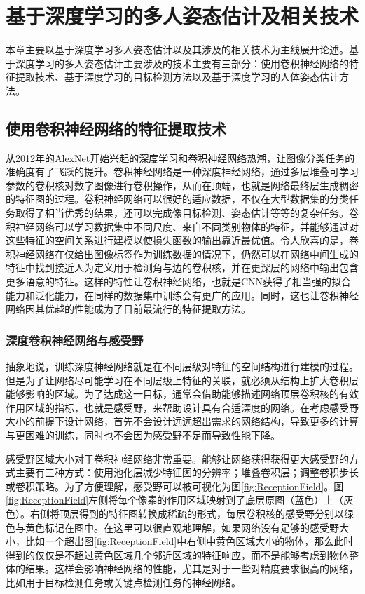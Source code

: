 \chapter{基于深度学习的多人姿态估计及相关技术}
\label{cha:basicfacts}
本章主要以基于深度学习多人姿态估计以及其涉及的相关技术为主线展开论述。基于深度学习的多人姿态估计主要涉及的技术主要有三部分：使用卷积神经网络的特征提取技术、基于深度学习的目标检测方法以及基于深度学习的人体姿态估计方法。
\section{使用卷积神经网络的特征提取技术}
\label{sec:factsfeature}
从2012年的AlexNet\cite{alex2012alexnet}开始兴起的深度学习和卷积神经网络热潮，让图像分类任务的准确度有了飞跃的提升。卷积神经网络是一种深度神经网络，通过多层堆叠可学习参数的卷积核对数字图像进行卷积操作，从而在顶端，也就是网络最终层生成稠密的特征图的过程。卷积神经网络可以很好的适应数据，不仅在大型数据集的分类任务取得了相当优秀的结果，还可以完成像目标检测、姿态估计等等的复杂任务。卷积神经网络可以学习数据集中不同尺度、来自不同类别物体的特征，并能够通过对这些特征的空间关系进行建模以使损失函数的输出靠近最优值。令人欣喜的是，卷积神经网络在仅给出图像标签作为训练数据的情况下，仍然可以在网络中间生成的特征中找到接近人为定义用于检测角与边的卷积核，并在更深层的网络中输出包含更多语意的特征\cite{yosinski2015understanding}。这样的特性让卷积神经网络，也就是CNN获得了相当强的拟合能力和泛化能力，在同样的数据集中训练会有更广的应用。同时，这也让卷积神经网络因其优越的性能成为了日前最流行的特征提取方法。
\subsection{深度卷积神经网络与感受野}
\label{subsec:factsreceptionfield}
抽象地说，训练深度神经网络就是在不同层级对特征的空间结构进行建模的过程。但是为了让网络尽可能学习在不同层级上特征的关联，就必须从结构上扩大卷积层能够影响的区域。为了达成这一目标，通常会借助能够描述网络顶层卷积核的有效作用区域的指标，也就是感受野，来帮助设计具有合适深度的网络。在考虑感受野大小的前提下设计网络，首先不会设计远远超出需求的网络结构，导致更多的计算与更困难的训练，同时也不会因为感受野不足而导致性能下降。

感受野区域大小对于卷积神经网络非常重要。能够让网络获得获得更大感受野的方式主要有三种方式：使用池化层减少特征图的分辨率；堆叠卷积层；调整卷积步长或卷积策略。为了方便理解，感受野可以被可视化为图\ref{fig:ReceptionField}。图\ref{fig:ReceptionField}左侧将每个像素的作用区域映射到了底层原图（蓝色）上（灰色）。右侧将顶层得到的特征图转换成稀疏的形式，每层卷积核的感受野分别以绿色与黄色标记在图中。在这里可以很直观地理解，如果网络没有足够的感受野大小，比如一个超出图\ref{fig:ReceptionField}中右侧中黄色区域大小的物体，那么此时得到的仅仅是不超过黄色区域几个邻近区域的特征响应，而不是能够考虑到物体整体的结果。这样会影响神经网络的性能，尤其是对于一些对精度要求很高的网络，比如用于目标检测任务或关键点检测任务的神经网络。

